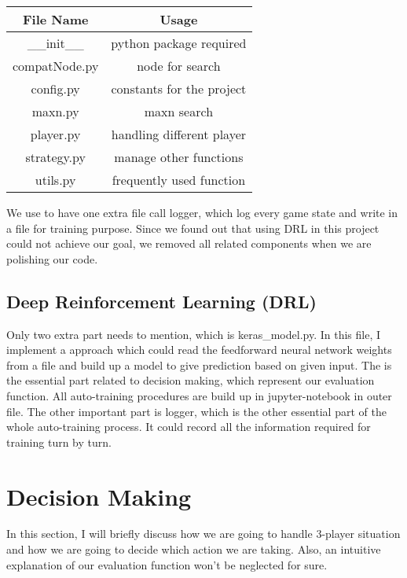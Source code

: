 \documentclass[11pt]{article}
\begin{document}
\begin{table}[H]
  \begin{tabular}{cc}

  \textbf{File Name}                  & \textbf{Usage}                        \\ \hline
  \multicolumn{1}{|c|}{\_\_init\_\_}  & \multicolumn{1}{c|}{python package required} \\ \hline
  \multicolumn{1}{|c|}{compatNode.py} & \multicolumn{1}{c|}{node for search}         \\ \hline
  \multicolumn{1}{|c|}{config.py}     & \multicolumn{1}{c|}{constants for the project}         \\ \hline
  \multicolumn{1}{|c|}{maxn.py}       & \multicolumn{1}{c|}{maxn search}         \\ \hline
  \multicolumn{1}{|c|}{player.py}        & \multicolumn{1}{c|}{handling different player}         \\ \hline
  \multicolumn{1}{|c|}{strategy.py}      & \multicolumn{1}{c|}{manage other functions}         \\ \hline
  \multicolumn{1}{|c|}{utils.py}         & \multicolumn{1}{c|}{frequently used function}         \\ \hline
  \end{tabular}
  \end{table}

We use to have one extra file call logger, which log every game state and write in a file for training purpose.
Since we found out that using DRL in this project could not achieve our goal, we removed all related components
when we are polishing our code.

\subsection{Deep Reinforcement Learning (DRL)}
Only two extra part needs to mention, which is keras\_model.py. 
In this file, I implement a approach which could read
the feedforward neural network weights from a file and build up a model to give prediction based on given input.
The is the essential part related to decision making, which represent our evaluation function. All auto-training 
procedures are build up in jupyter-notebook in outer file.
The other important part is logger, which is the other essential part of the whole auto-training process. It could
record all the information required for training turn by turn.

\section{Decision Making}
In this section, I will briefly discuss how we are going to handle 3-player situation and how we are going to decide
which action we are taking. Also, an intuitive explanation of our evaluation function won't be neglected for sure.
\end{document}
